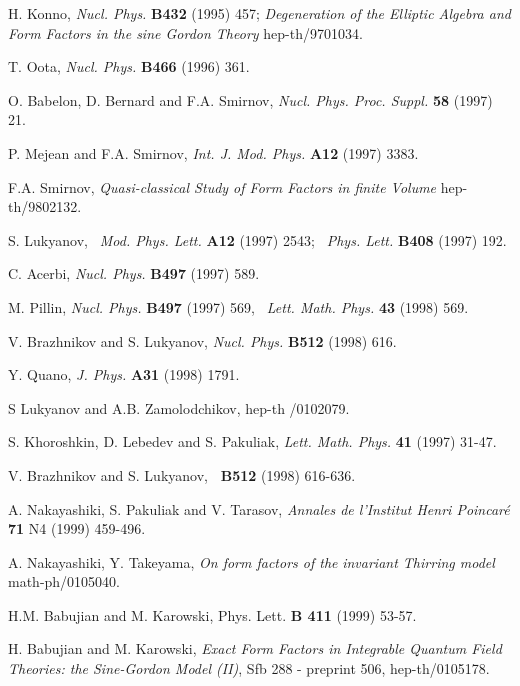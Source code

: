 \documentclass[a4paper,12pt]{article}
\begin{document}
\begin{thebibliography}{99}
  H. Konno, \emph{Nucl. Phys.} \textbf{B432} (1995) 457; 
\newline
\emph{Degeneration of the Elliptic Algebra \coordHE{} and Form
Factors in the sine Gordon Theory} hep-th/9701034.

  T. Oota, \emph{Nucl. Phys.} \textbf{B466} (1996) 361.

  O. Babelon, D. Bernard and F.A. Smirnov, \emph{Nucl. Phys.
Proc. Suppl.} \textbf{58} (1997) 21.

  P. Mejean and F.A. Smirnov, \emph{Int. J. Mod. Phys.} \textbf{%
A12} (1997) 3383.

  F.A. Smirnov, \emph{Quasi-classical Study of Form Factors in
finite Volume} hep-th/9802132.

  S. Lukyanov, \emph{\ Mod. Phys. Lett.} \textbf{A12} (1997)
2543; \emph{\ Phys. Lett.} \textbf{B408} (1997) 192.

  C. Acerbi, \emph{Nucl. Phys.} \textbf{B497} (1997) 589.

  M. Pillin, \emph{Nucl. Phys.} \textbf{B497} (1997) 569, \emph{%
\ Lett. Math. Phys. } \textbf{43} (1998) 569.

  V. Brazhnikov and S. Lukyanov, \emph{Nucl. Phys.} \textbf{%
B512} (1998) 616.

  Y. Quano, \emph{J. Phys.} \textbf{A31} (1998) 1791.

  S Lukyanov and A.B. Zamolodchikov, hep-th /0102079.

  S. Khoroshkin, D. Lebedev and S. Pakuliak, \emph{Lett. Math.
Phys. }\textbf{41} (1997) 31-47.

  V. Brazhnikov and S. Lukyanov, \coordHE{}\textbf{\
B512} (1998) 616-636.

  A. Nakayashiki, S. Pakuliak and V. Tarasov, \emph{Annales de
l'Institut Henri Poincar\'{e} }\textbf{71 }N4 (1999) 459-496.

  A. Nakayashiki, Y. Takeyama, \emph{On form factors of the }\myHighlight{$%
SU(2)$}\coordHE{} \emph{invariant Thirring model }math-ph/0105040.

  H.M. Babujian and M. Karowski, Phys. Lett. \textbf{B 411}
(1999) 53-57.

  H. Babujian and M. Karowski, \emph{Exact Form Factors in
Integrable Quantum Field Theories: the Sine-Gordon Model (II)}, Sfb 288 -
preprint 506, hep-th/0105178.


\end{thebibliography}
\end{document}

